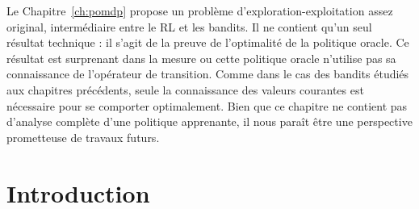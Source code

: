 Le Chapitre~\ref{ch:pomdp} propose un problème d'exploration-exploitation assez original, intermédiaire entre le RL et les bandits. Il ne contient qu'un seul résultat technique : il s'agit de la preuve de l'optimalité de la politique oracle. Ce résultat est surprenant dans la mesure ou cette politique oracle n'utilise pas sa connaissance de l'opérateur de transition. Comme dans le cas des bandits étudiés aux chapitres précédents, seule la connaissance des valeurs courantes est nécessaire pour se comporter optimalement. Bien que ce chapitre ne contient pas d'analyse complète d'une politique apprenante, il nous paraît être une perspective prometteuse de travaux futurs.

\part{Introduction}




